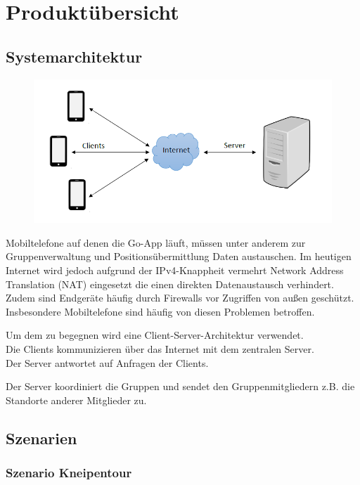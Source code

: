 \section{Produktübersicht}


\subsection{Systemarchitektur}

\begin{figure} [H]
	\centering
	\includegraphics[scale = 0.8]{res/clientServerArchitektur.png}
\end{figure}

Mobiltelefone auf denen die Go-App läuft, müssen unter anderem zur Gruppenverwaltung
und Positionsübermittlung Daten austauschen.
Im heutigen Internet wird jedoch aufgrund der IPv4-Knappheit vermehrt Network Address Translation (NAT)
eingesetzt die einen direkten Datenaustausch verhindert. Zudem sind Endgeräte häufig durch Firewalls vor Zugriffen
von außen geschützt.
Insbesondere Mobiltelefone sind häufig von diesen Problemen betroffen.

Um dem zu begegnen wird eine Client-Server-Architektur verwendet. \\
Die Clients kommunizieren über das Internet mit dem zentralen Server. \\
Der Server antwortet auf Anfragen der Clients.

Der Server koordiniert die Gruppen und sendet den Gruppenmitgliedern z.B.
die Standorte anderer Mitglieder zu.

\subsection{Szenarien}
\subsubsection{Szenario Kneipentour}

